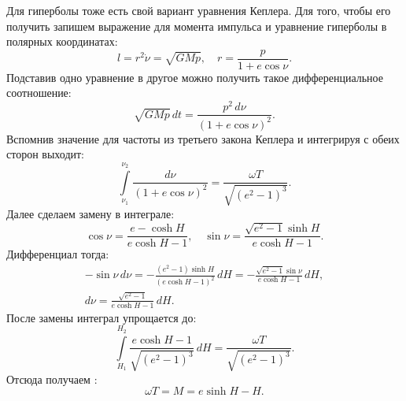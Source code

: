 Для гиперболы тоже есть свой вариант уравнения Кеплера. Для того, чтобы его получить запишем выражение для момента импульса и уравнение гиперболы в полярных координатах:
\begin{equation*}
	l = r^2 \dot{\nu} = \sqrt{GMp}, \quad r = \frac{p}{1 + e \cos \nu}.
\end{equation*}
Подставив одно уравнение в другое можно получить такое дифференциальное соотношение:
\begin{equation*}
	\sqrt{GMp}\,dt=\frac{p^2 \,d\nu}{(1 + e \cos{\nu})^2}.
\end{equation*}
Вспомнив значение для частоты из третьего закона Кеплера и интегрируя с обеих сторон выходит:
\begin{equation*}
	\int\limits_{\nu_1}^{\nu_2}{\frac{d\nu}{(1+e\cos \nu)^2}} = \frac{\omega T}{\sqrt{(e^2 - 1)^3}}.
\end{equation*}
Далее сделаем замену в интеграле:
\begin{equation*}
	\cos \nu = \frac{e - \cosh H}{e \cosh H - 1}, \quad \sin \nu = \frac{\sqrt{e^2-1} \sinh H}{e \cosh H - 1}.
\end{equation*}
Дифференциал тогда:
\begin{gather*}
	-\sin \nu \, d \nu = -\frac{(e^2 - 1) \sinh H}{(e \cosh H - 1)^2}\,dH = -\frac{\sqrt{e^2-1}\sin \nu}{e \cosh H - 1}\,dH, \\
	d\nu = \frac{\sqrt{e^2-1}}{e \cosh H - 1}\,dH.
\end{gather*}
После замены интеграл упрощается до:
\begin{equation*}
	\int\limits_{H_1}^{H_2}{\frac{e \cosh H - 1}{\sqrt{(e^2-1)^3}} \,dH} = \frac{\omega T}{\sqrt{(e^2 - 1)^3}}.
\end{equation*}
Отсюда получаем :
\begin{equation}
	\omega T = M = e \sinh H - H.
\end{equation}